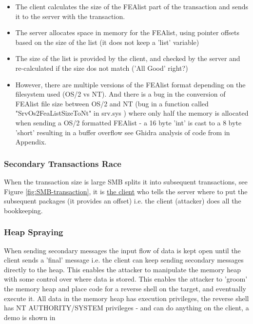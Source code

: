\documentclass[
	letterpaper, %
	10pt, %
	unnumberedsections, %
	twoside, %
]{LTJournalArticle}
\begin{document}
\begin{itemize}
	\item The client calculates the size of the FEAlist part of the transaction and sends it to the server with the transaction.  
	\item The server allocates space in memory for the FEAlist, using pointer offsets based on the size of the list (it does not keep a 'list' variable)
	\item The size of the list is provided by the client, and checked by the server and re-calculated if the size dos not match ('All Good' right?) 
	\item However, there are multiple versions of the FEAlist format depending on the filesystem used (OS/2 vs NT). And there is a bug in the conversion of FEAlist file size between OS/2 and NT (bug in a function called "SrvOs2FeaListSizeToNt" in srv.sys \cite{h3xduck}) where only half the memory is allocated when sending a OS/2 formatted FEAlist - a 16 byte 'int' is cast to a 8 byte 'short' resulting in a buffer overflow see Ghidra analysis of code from \cite{h3xduck} in Appendix. 
\end{itemize}

\subsubsection{Secondary Transactions Race}
When the transaction size is large SMB splits it into subsequent transactions, see Figure \ref{fig:SMB-transaction}, it is \underline{the client} who tells the server where to put the subsequent packages (it provides an offset) i.e. the client (attacker) does all the bookkeeping.

\subsubsection{Heap Spraying} When sending secondary messages the input flow of data is kept open until the client sends a 'final' message i.e. the client can keep sending secondary messages directly to the heap. This enables the attacker to manipulate the memory heap with some control over where data is stored. This enables the attacker to 'groom' \cite{zerosum0x0-defcon26} the memory heap and place code for a reverse shell on the target, and eventually execute it. All data in the memory heap has execution privileges, the reverse shell has NT AUTHORITY/SYSTEM privileges - and can do anything on the client, a demo is shown in       
\end{document}
